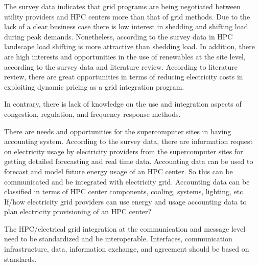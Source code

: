 The survey data indicates that grid programs are being negotiated between utility providers and HPC centers more than that of grid methods. Due to the lack of a clear business case there is low interest in shedding and shifting load during peak demands. Nonetheless, according to the survey data in HPC landscape load shifting is more attractive than shedding load. In addition, there are high interests and opportunities in the use of renewables at the site level, according to the survey data and literature review. According to literature review, there are great opportunities in terms of reducing electricity costs in exploiting dynamic pricing as a grid integration program.

In contrary, there is lack of knowledge on the use and integration aspects of congestion, regulation, and frequency response methods. 

There are needs and opportunities for the supercomputer sites in having accounting system. According to the survey data, there are information request on electricity usage by electricity providers from the supercomputer sites for getting detailed forecasting and real time data. Accounting data can be used to forecast and model future energy usage of an HPC center. So this can be communicated and be integrated with electricity grid. Accounting data can be classified in terms of HPC center components, cooling, systems, lighting, etc. If/how electricity grid providers can use energy and usage accounting data to plan electricity provisioning of an HPC center? %

The HPC/electrical grid integration at the communication and message level need to be standardized and be interoperable. Interfaces, communication infrastructure, data, information exchange, and agreement should be based on standards.
